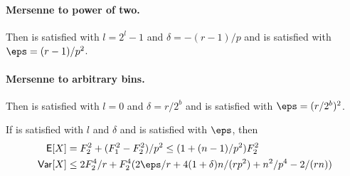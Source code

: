 \paragraph{Mersenne to power of two.}
Then  is satisfied with $l = 2^l - 1$ and
$\delta = -(r - 1)/p$ and  is satisfied
with $\eps = (r - 1)/p^2$.

\paragraph{Mersenne to arbitrary bins.}
Then  is satisfied with $l = 0$ and
$\delta = r/2^b$ and  is satisfied
with $\eps = (r/2^b)^2$.

\begin{lemma}
    If  is satisfied with $l$
    and $\delta$ and  is satisfied with
    $\eps$, then
    \begin{align}
        \E[X] &= F_2^2 + (F_1^2 - F_2^2)/p^2 \le (1 + (n - 1)/p^2)F_2^2\\
        \Var[X] &\le 2F_2^4/r + F_2^4 (2\eps/r + 4(1 + \delta)n / (rp^2) + n^2/p^4 - 2 /(rn))
    \end{align}
\end{lemma}
